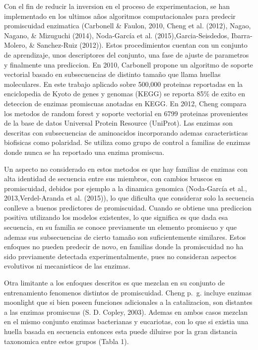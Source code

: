 \documentclass[12pt,twoside]{reedthesis}
\begin{document}
  Con el fin de reducir la inversion en el proceso de experimentacion, se
  han implementado en los ultimos años algoritmos computacionales para
  predecir promiscuidad enzimatica (Carbonell \& Faulon, 2010, Cheng et
  al. (2012), Nagao, Nagano, \& Mizuguchi (2014), Noda-García et al.
  (2015),Garcia-Seisdedos, Ibarra-Molero, \& Sanchez-Ruiz (2012)). Estos
  procedimientos cuentan con un conjunto de aprendizaje, unos descriptores
  del conjunto, una fase de ajuste de parametros y finalmente una
  prediccion. En 2010, Carbonell propone un algoritmo de soporte vectorial
  basado en subsecuencias de distinto tamaño que llama huellas
  moleculares. En este trabajo aplicado sobre 500,000 proteinas reportadas
  en la enciclopedia de Kyoto de genes y genomas (KEGG) se reporta 85\% de
  exito en deteccion de enzimas promiscuas anotadas en KEGG. En 2012,
  Cheng compara los metodos de random forest y soporte vectorial en 6799
  proteinas provenientes de la base de datos Universal Protein Resource
  (UniProt). Las enzimas son descritas con subsecuencias de aminoacidos
  incorporando ademas caracteristicas biofisicas como polaridad. Se
  utiliza como grupo de control a familias de enzimas donde nunca se ha
  reportado una enzima promiscua.
  
  Un aspecto no considerado en estos metodos es que hay familias de
  enzimas con alta identidad de secuencia entre sus miembros, con cambios
  bruscos en promiscuidad, debidos por ejemplo a la dinamica genomica
  (Noda-García et al., 2013,Verdel-Aranda et al. (2015)), lo que dificulta
  que considerar solo la secuencia conlleve a buenos predictores de
  promiscuidad. Cuando se obtiene una prediccion positiva utilizando los
  modelos existentes, lo que significa es que dada esa secuencia, en su
  familia se conoce previamente un elemento promiscuo y que ademas sus
  subsecuencias de cierto tamaño son suficientemente similares. Estos
  enfoques no pueden predecir de novo, en familias donde la promiscuidad
  no ha sido previamente detectada experimentalmente, pues no consideran
  aspectos evolutivos ni mecanisticos de las enzimas.
  
  Otra limitante a los enfoques descritos es que mezclan en su conjunto de
  entrenamiento fenomenos distintos de promiscuidad. Cheng p.~g. incluye
  enzimas moonlight que si bien poseen funciones adicionales a la
  catalizacion, son distantes a las enzimas promiscuas (S. D. Copley,
  2003). Ademas en ambos casos mezclan en el mismo conjunto enzimas
  bacterianas y eucariotas, con lo que si existia una huella basada en
  secuencia entonces esta puede diluirse por la gran distancia taxonomica
  entre estos grupos (Tabla 1).
  
\end{document}

